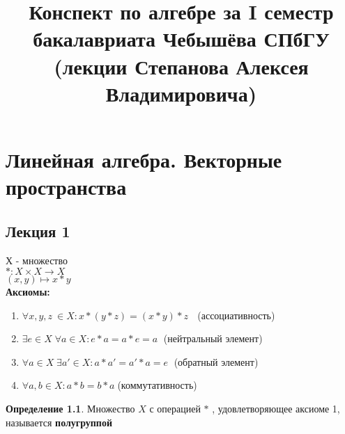 \documentclass[12pt]{report}
\begin{document}
\renewcommand{\proofname}{Доказательство}

\theoremstyle{plain}
\newtheorem{thm}{Теорема}[section]
\newtheorem*{lm}{Лемма}
\newtheorem*{st}{Утверждение}
\newtheorem*{prop}{Свойства}

\theoremstyle{definition}
\newtheorem{defn}{Определение}
\newtheorem*{ex}{Пример}
\newtheorem*{exs}{Примеры}
\newtheorem*{cor}{Следствие}
\newtheorem*{name}{Обозначение}

\theoremstyle{remark}
\newtheorem*{rem}{Ремарка}
\newtheorem*{note}{Замечание}
\newtheorem*{probl}{Упражнение}

\newcommand{\Z}{\mathbb{Z}}
\newcommand{\N}{\mathbb{N}}
\newcommand{\R}{\mathbb{R}}
\newcommand{\Q}{\mathbb{Q}}
\newcommand{\K}{\mathbb{K}}
\newcommand{\Cm}{\mathbb{C}}
\newcommand{\Pm}{\mathbb{P}}
\newcommand{\ilim}{\int\limits}
\newcommand{\slim}{\sum\limits}


\title{Конспект по алгебре за I семестр бакалавриата Чебышёва СПбГУ (лекции Степанова Алексея Владимировича)}                      
\maketitle
\clearpage
\tableofcontents
\clearpage
\chapter{Линейная алгебра. Векторные пространства}
\section{Лекция 1}
Х - множество\\
$ *: X \times X \to X$\\
$ (x, y) \mapsto x * y$\\
{\bf Аксиомы:}
\begin{enumerate}
    \item $\forall x,y,z \: \in X: x*(y*z) = (x*y)*z$ $\;$ (ассоциативность)
    \item $\exists e \in X \; \forall a \in X: e*a = a*e = a \;$ (нейтральный элемент)
    \item $\forall a \in X \; \exists a' \in X: a*a' = a' * a = e \;$ (обратный элемент)
    \item $\forall a, b \in X: a * b = b * a \; $(коммутативность)
\end{enumerate}

\begin{defn}
Множество $X$ с операцией $*$ , удовлетворяющее  аксиоме 1, называется {\bf полугруппой}
\end{defn}
\end{document}
